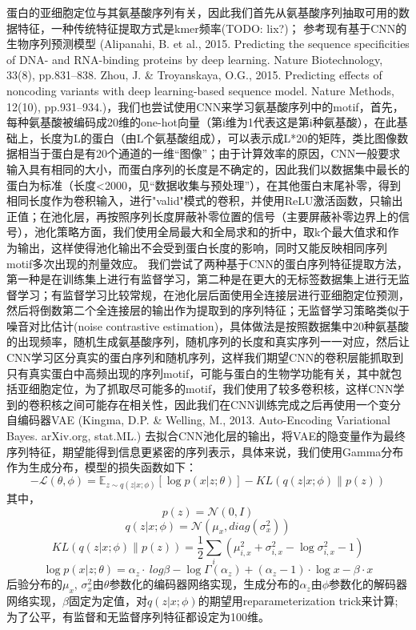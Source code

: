 \documentclass[a4paper,UTF8]{article}
\begin{document}
蛋白的亚细胞定位与其氨基酸序列有关，因此我们首先从氨基酸序列抽取可用的数据特征，一种传统特征提取方式是kmer频率(TODO: lix?)；
参考现有基于CNN的生物序列预测模型 (Alipanahi, B. et al., 2015. Predicting the sequence specificities of DNA- and RNA-binding proteins by deep learning. Nature Biotechnology, 33(8), pp.831–838. Zhou, J. & Troyanskaya, O.G., 2015. Predicting effects of noncoding variants with deep learning-based sequence model. Nature Methods, 12(10), pp.931–934.)，我们也尝试使用CNN来学习氨基酸序列中的motif，首先，每种氨基酸被编码成20维的one-hot向量（第i维为1代表这是第i种氨基酸），在此基础上，长度为L的蛋白（由L个氨基酸组成），可以表示成L*20的矩阵，类比图像数据相当于蛋白是有20个通道的一维“图像”；由于计算效率的原因，CNN一般要求输入具有相同的大小，而蛋白序列的长度是不确定的，因此我们以数据集中最长的蛋白为标准（长度<2000，见“数据收集与预处理”），在其他蛋白末尾补零，得到相同长度作为卷积输入，进行"valid"模式的卷积，并使用ReLU激活函数，只输出正值；在池化层，再按照序列长度屏蔽补零位置的信号（主要屏蔽补零边界上的信号），池化策略方面，我们使用全局最大和全局求和的折中，取k个最大值求和作为输出，这样使得池化输出不会受到蛋白长度的影响，同时又能反映相同序列motif多次出现的剂量效应。
我们尝试了两种基于CNN的蛋白序列特征提取方法，第一种是在训练集上进行有监督学习，第二种是在更大的无标签数据集上进行无监督学习；有监督学习比较常规，在池化层后面使用全连接层进行亚细胞定位预测，然后将倒数第二个全连接层的输出作为提取到的序列特征；无监督学习策略类似于噪音对比估计(noise contrastive estimation)，具体做法是按照数据集中20种氨基酸的出现频率，随机生成氨基酸序列，随机序列的长度和真实序列一一对应，然后让CNN学习区分真实的蛋白序列和随机序列，这样我们期望CNN的卷积层能抓取到只有真实蛋白中高频出现的序列motif，可能与蛋白的生物学功能有关，其中就包括亚细胞定位，为了抓取尽可能多的motif，我们使用了较多卷积核，这样CNN学到的卷积核之间可能存在相关性，因此我们在CNN训练完成之后再使用一个变分自编码器VAE (Kingma, D.P. & Welling, M., 2013. Auto-Encoding Variational Bayes. arXiv.org, stat.ML.) 去拟合CNN池化层的输出，将VAE的隐变量作为最终序列特征，期望能得到信息更紧密的序列表示，具体来说，我们使用Gamma分布作为生成分布，模型的损失函数如下：
$$-\mathcal L(\theta, \phi) = \mathbb E_{z \sim q(z|x;\phi)} [\log p(x|z;\theta)] - KL(q(z|x;\phi) \parallel p(z))$$
其中，
$$p(z)=\mathcal N(0, I)$$
$$q(z|x;\phi)=\mathcal N(\mu_x, diag(\sigma_x^2))$$
$$KL(q(z|x;\phi) \parallel p(z)) = \frac 1 2 \sum_i (\mu_{i,x}^2 + \sigma_{i,x}^2 - \log \sigma_{i,x}^2 - 1)$$
$$\log p(x|z;\theta)=\alpha_z \cdot\ log \beta - \log \Gamma(\alpha_z) + (\alpha_z - 1) \cdot \log x - \beta \cdot x$$
后验分布的$\mu_x$, $\sigma_x^2$由$\theta$参数化的编码器网络实现，生成分布的$\alpha_z$由$\phi$参数化的解码器网络实现，$\beta$固定为定值，对$q(z|x;\phi)$的期望用reparameterization trick来计算;
为了公平，有监督和无监督序列特征都设定为100维。
\end{document}
